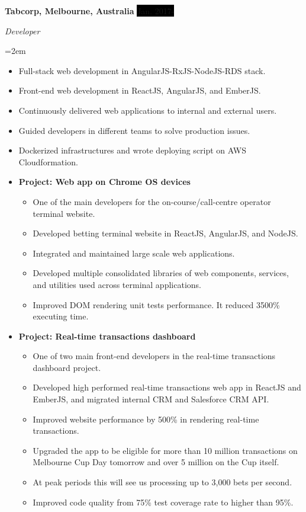 \documentclass[a4paper, 11pt]{article}
\newcommand{\EducationEntry}[4]{
		\noindent \textbf{#1} \hfill      %
		\colorbox{White}{%
			\parbox{5cm}{%
			\hfill\color{Black}#2}} \par  %
		\noindent \textit{#3} \par        %
		\noindent\hangindent=2em\hangafter=0 \small #4 %
		\normalsize \par}
\newcommand{\WorkEntry}[4]{				  %
		\noindent \textbf{#1} \hfill      %
		\noindent\colorbox{Black}{\color{White}#2} \par  %
		\noindent \textit{#3} \par              %
		\noindent\hangindent=2em\hangafter=0 \small #4 %
		\normalsize \par}
\begin{document}
\WorkEntry{Tabcorp, Melbourne, Australia}{Jan. 2017-}{Developer}{
\begin{itemize}
	\item {Full-stack web development in AngularJS-RxJS-NodeJS-RDS stack.}
	\item {Front-end web development in ReactJS, AngularJS, and EmberJS.}
	\item {Continuously delivered web applications to internal and external users.}
	\item {Guided developers in different teams to solve production issues.}
	\item {Dockerized infrastructures and wrote deploying script on AWS Cloudformation.}
	\item []{
		\textbf{Project: Web app on Chrome OS devices}
		\begin{itemize}
			\item {One of the main developers for the on-course/call-centre operator terminal website.}
			\item {Developed betting terminal website in ReactJS, AngularJS, and NodeJS.}
			\item {Integrated and maintained large scale web applications.}
			\item {Developed multiple consolidated libraries of web components, services, and utilities used across terminal applications.}
			\item {Improved DOM rendering unit tests performance. It reduced 3500\% executing time.}
		\end{itemize}
	}
	\item []{
		\textbf{Project: Real-time transactions dashboard}
		\begin{itemize}
			\item {One of two main front-end developers in the real-time transactions dashboard project.}
			\item {Developed high performed real-time transactions web app in ReactJS and EmberJS, and migrated internal CRM and Salesforce CRM API.}
			\item {Improved website performance by 500\% in rendering real-time transactions.}
			\item {Upgraded the app to be eligible for more than 10 million transactions on Melbourne Cup Day tomorrow and over 5 million on the Cup itself.}
			\item {At peak periods this will see us processing up to 3,000 bets per second.}
			\item {Improved code quality from 75\% test coverage rate to higher than 95\%.}
		\end{itemize}
	}
\end{itemize}
}
\end{document}
